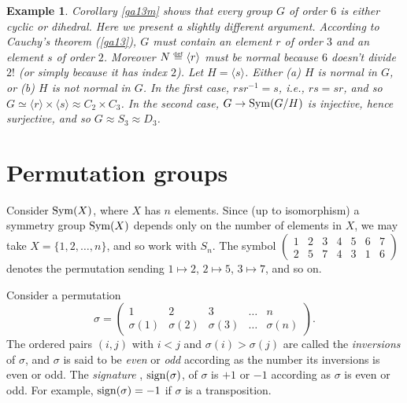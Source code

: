 \documentclass[a4paper,11pt,final]{memoir}%
\newtheorem{example}[X]{Example}
\theoremstyle{nonumberplain}
\begin{document}
\begin{example}
\label{ga20} Corollary \ref{ga13m} shows that every group $G$ of order $6$ is
either cyclic or dihedral. Here we present a slightly different argument.
According to Cauchy's theorem (\ref{ga13}), $G$ must contain an element $r$ of
order $3$ and an element $s$ of order $2$. Moreover
$N\overset{\df}{=}\langle r\rangle$ must be normal because $6$
doesn't divide $2!$ (or simply because it has index $2$). Let $H=\langle
s\rangle$. Either (a) $H$ is normal in $G$, or (b) $H$ is not normal in $G$.
In the first case, $rsr^{-1}=s$, i.e., $rs=sr$, and so $G\simeq\langle
r\rangle\times\langle s\rangle\approx C_{2}\times C_{3}$. In the second case,
$G\rightarrow\operatorname{Sym}(G/H)$ is injective, hence surjective, and so $G\approx
S_{3}\approx D_{3}$.
\end{example}

\section{Permutation groups}

Consider $\operatorname{Sym}(X)$, where $X$ has $n$ elements. Since (up to isomorphism) a
symmetry group $\operatorname{Sym}(X)$ depends only on the number of elements in $X$, we may
take $X=\{1,2,\ldots,n\}$, and so work with $S_{n}$. The symbol $\left(
\begin{smallmatrix}
1 & 2 & 3 & 4 & 5 & 6 & 7\\
2 & 5 & 7 & 4 & 3 & 1 & 6
\end{smallmatrix}
\right)  $ denotes the permutation sending $1\mapsto2$, $2\mapsto5$,
$3\mapsto7$, and so on.

Consider a permutation
\[
\sigma=%
\begin{pmatrix}
1 & 2 & 3 & \ldots & n\\
\sigma(1) & \sigma(2) & \sigma(3) & \ldots & \sigma(n)
\end{pmatrix}
.
\]
The ordered pairs $(i,j)$ with $i<j$ and $\sigma(i)>\sigma(j)$ are called the
\emph{inversions}%
of $\sigma$, and $\sigma$ is said to be \emph{even\/}%
or \emph{odd\/}%
according as the number its inversions is even or odd. The \emph{signature}%
%
, $\operatorname{sign}(\sigma)$,\/ of $\sigma$ is $+1$ or $-1$ according as $\sigma$ is even
or odd. For example, $\operatorname{sign}(\sigma)=-1$ if $\sigma$ is a transposition.
\end{document}
